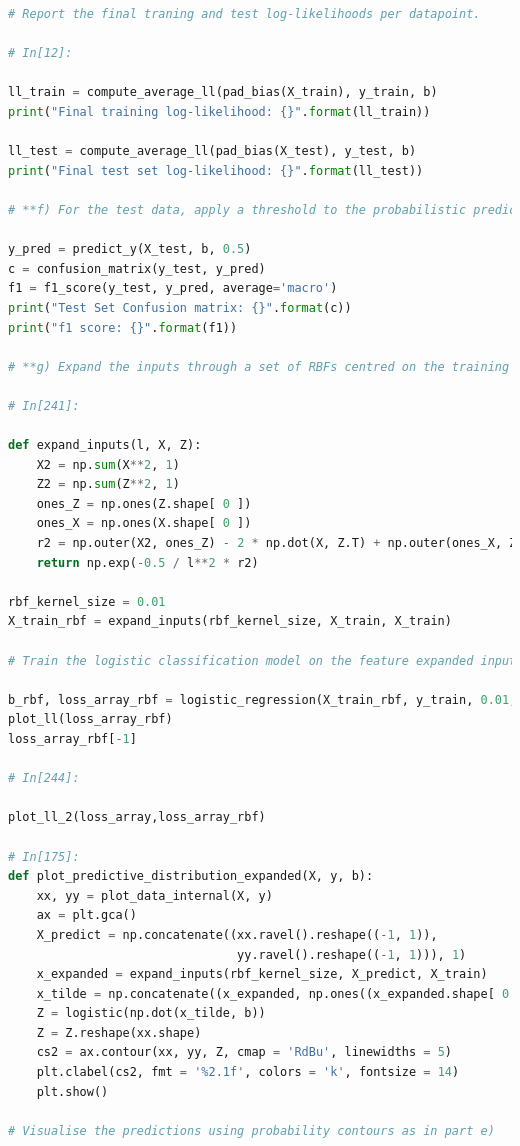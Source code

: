 \documentclass[journal]{IEEEtran}
\begin{document}
\begin{lstlisting}[language=Python]
# Report the final traning and test log-likelihoods per datapoint.

# In[12]:

ll_train = compute_average_ll(pad_bias(X_train), y_train, b)
print("Final training log-likelihood: {}".format(ll_train))

ll_test = compute_average_ll(pad_bias(X_test), y_test, b)
print("Final test set log-likelihood: {}".format(ll_test))

# **f) For the test data, apply a threshold to the probabilistic predictions. Confusion matrix and f1 score are calculated**

y_pred = predict_y(X_test, b, 0.5)
c = confusion_matrix(y_test, y_pred)
f1 = f1_score(y_test, y_pred, average='macro')  
print("Test Set Confusion matrix: {}".format(c))
print("f1 score: {}".format(f1))

# **g) Expand the inputs through a set of RBFs centred on the training datapoints**

# In[241]:

def expand_inputs(l, X, Z):
    X2 = np.sum(X**2, 1)
    Z2 = np.sum(Z**2, 1)
    ones_Z = np.ones(Z.shape[ 0 ])
    ones_X = np.ones(X.shape[ 0 ])
    r2 = np.outer(X2, ones_Z) - 2 * np.dot(X, Z.T) + np.outer(ones_X, Z2)
    return np.exp(-0.5 / l**2 * r2)

rbf_kernel_size = 0.01
X_train_rbf = expand_inputs(rbf_kernel_size, X_train, X_train)

# Train the logistic classification model on the feature expanded inputs and display the new predictions

b_rbf, loss_array_rbf = logistic_regression(X_train_rbf, y_train, 0.01, max_iter = 2000)
plot_ll(loss_array_rbf)
loss_array_rbf[-1]

# In[244]:

plot_ll_2(loss_array,loss_array_rbf)

# In[175]:
def plot_predictive_distribution_expanded(X, y, b):
    xx, yy = plot_data_internal(X, y)
    ax = plt.gca()
    X_predict = np.concatenate((xx.ravel().reshape((-1, 1)),
                                yy.ravel().reshape((-1, 1))), 1)
    x_expanded = expand_inputs(rbf_kernel_size, X_predict, X_train)
    x_tilde = np.concatenate((x_expanded, np.ones((x_expanded.shape[ 0 ], 1 ))), 1)
    Z = logistic(np.dot(x_tilde, b))
    Z = Z.reshape(xx.shape)
    cs2 = ax.contour(xx, yy, Z, cmap = 'RdBu', linewidths = 5)
    plt.clabel(cs2, fmt = '%2.1f', colors = 'k', fontsize = 14)
    plt.show()

# Visualise the predictions using probability contours as in part e)


\end{lstlisting}
\end{document}
